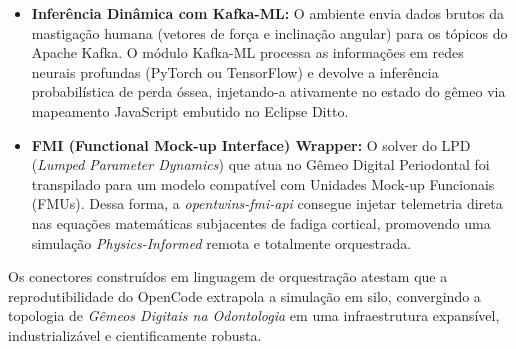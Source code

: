 \begin{itemize}
    \item \textbf{Inferência Dinâmica com Kafka-ML:} O ambiente envia dados brutos da mastigação humana (vetores de força e inclinação angular) para os tópicos do Apache Kafka. O módulo Kafka-ML processa as informações em redes neurais profundas (PyTorch ou TensorFlow) e devolve a inferência probabilística de perda óssea, injetando-a ativamente no estado do gêmeo via mapeamento JavaScript embutido no Eclipse Ditto.
    
    \item \textbf{FMI (Functional Mock-up Interface) Wrapper:} O solver do LPD (\textit{Lumped Parameter Dynamics}) que atua no Gêmeo Digital Periodontal foi transpilado para um modelo compatível com Unidades Mock-up Funcionais (FMUs). Dessa forma, a \textit{opentwins-fmi-api} consegue injetar telemetria direta nas equações matemáticas subjacentes de fadiga cortical, promovendo uma simulação \textit{Physics-Informed} remota e totalmente orquestrada.
\end{itemize}

Os conectores construídos em linguagem de orquestração atestam que a reprodutibilidade do OpenCode extrapola a simulação em silo, convergindo a topologia de \textit{Gêmeos Digitais na Odontologia} em uma infraestrutura expansível, industrializável e cientificamente robusta.
